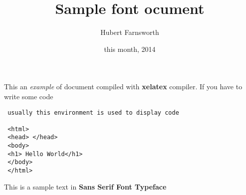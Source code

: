 \documentclass[12pt]{article}
\title{Sample font ocument}
\author{Hubert Farnsworth}
\date{this month, 2014}
\begin{document}
\maketitle

 This an \textit{example} of document compiled with
 \textbf{xelatex} compiler. If you have to write
 some code

 \begin{verbatim}
 usually this environment is used to display code

 <html>
 <head> </head>
 <body>
 <h1> Hello World</h1>
 </body>
 </html>
 \end{verbatim}

  {\sffamily This is a sample text in \textbf{Sans Serif Font Typeface}}
\end{document}
